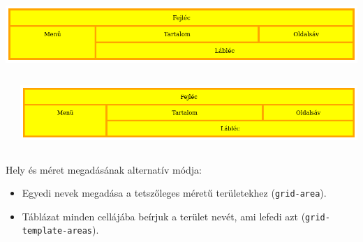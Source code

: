 \begin{frame}
    \begin{center}
        \includegraphics[scale=0.3]{racs3.png}
    \end{center}
    \begin{exampleblock}{}
        \footnotesize
        
    \end{exampleblock}
\end{frame}

\begin{frame}
    \begin{columns}
            \begin{exampleblock}{}
                \scriptsize
                \vspace{-.2cm}
                
                \vspace{-.2cm}
            \end{exampleblock}
            \includegraphics[width=\columnwidth]{racs3.png}
    \end{columns}
\end{frame}

\begin{frame}
    Hely és méret megadásának alternatív módja:
    \begin{itemize}
        \item Egyedi nevek megadása a tetszőleges méretű területekhez (\texttt{grid-area}).
        \item Táblázat minden cellájába beírjuk a terület nevét, ami lefedi azt (\texttt{grid-template-areas}).
    \end{itemize}
    \begin{exampleblock}{}
        \scriptsize
        \vspace{-.2cm}
        
        \vspace{-.2cm}
    \end{exampleblock}
\end{frame}

\begin{frame}
    \begin{exampleblock}{}
        
    \end{exampleblock}
\end{frame}